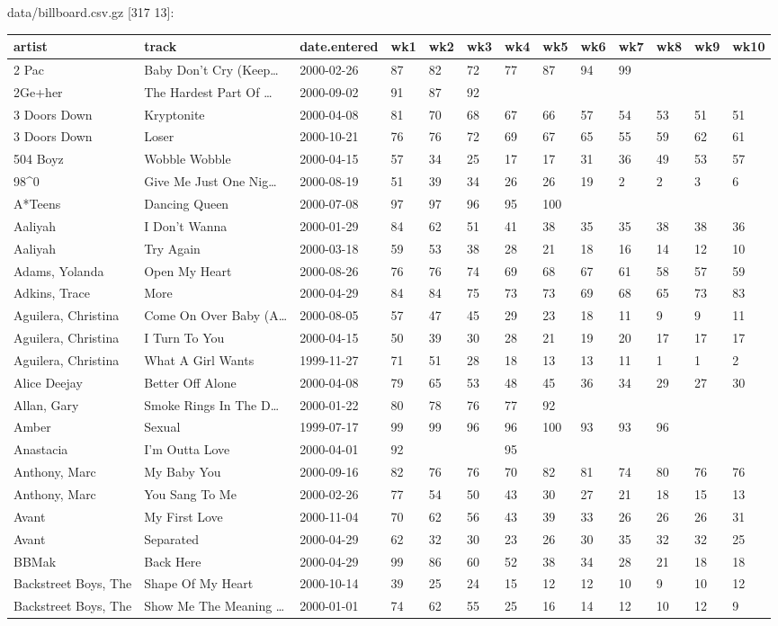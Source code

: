 \documentclass[]{article}
\begin{document}
data/billboard.csv.gz {[}317 13{]}:

\begin{longtable}[]{@{}lllllllllllll@{}}
\toprule
artist & track & date.entered & wk1 & wk2 & wk3 & wk4 & wk5 & wk6 & wk7
& wk8 & wk9 & wk10\tabularnewline
\midrule
\endhead
2 Pac & Baby Don't Cry (Keep\ldots{} & 2000-02-26 & 87 & 82 & 72 & 77 &
87 & 94 & 99 & & &\tabularnewline
2Ge+her & The Hardest Part Of \ldots{} & 2000-09-02 & 91 & 87 & 92 & & &
& & & &\tabularnewline
3 Doors Down & Kryptonite & 2000-04-08 & 81 & 70 & 68 & 67 & 66 & 57 &
54 & 53 & 51 & 51\tabularnewline
3 Doors Down & Loser & 2000-10-21 & 76 & 76 & 72 & 69 & 67 & 65 & 55 &
59 & 62 & 61\tabularnewline
504 Boyz & Wobble Wobble & 2000-04-15 & 57 & 34 & 25 & 17 & 17 & 31 & 36
& 49 & 53 & 57\tabularnewline
98\^{}0 & Give Me Just One Nig\ldots{} & 2000-08-19 & 51 & 39 & 34 & 26
& 26 & 19 & 2 & 2 & 3 & 6\tabularnewline
A*Teens & Dancing Queen & 2000-07-08 & 97 & 97 & 96 & 95 & 100 & & & &
&\tabularnewline
Aaliyah & I Don't Wanna & 2000-01-29 & 84 & 62 & 51 & 41 & 38 & 35 & 35
& 38 & 38 & 36\tabularnewline
Aaliyah & Try Again & 2000-03-18 & 59 & 53 & 38 & 28 & 21 & 18 & 16 & 14
& 12 & 10\tabularnewline
Adams, Yolanda & Open My Heart & 2000-08-26 & 76 & 76 & 74 & 69 & 68 &
67 & 61 & 58 & 57 & 59\tabularnewline
Adkins, Trace & More & 2000-04-29 & 84 & 84 & 75 & 73 & 73 & 69 & 68 &
65 & 73 & 83\tabularnewline
Aguilera, Christina & Come On Over Baby (A\ldots{} & 2000-08-05 & 57 &
47 & 45 & 29 & 23 & 18 & 11 & 9 & 9 & 11\tabularnewline
Aguilera, Christina & I Turn To You & 2000-04-15 & 50 & 39 & 30 & 28 &
21 & 19 & 20 & 17 & 17 & 17\tabularnewline
Aguilera, Christina & What A Girl Wants & 1999-11-27 & 71 & 51 & 28 & 18
& 13 & 13 & 11 & 1 & 1 & 2\tabularnewline
Alice Deejay & Better Off Alone & 2000-04-08 & 79 & 65 & 53 & 48 & 45 &
36 & 34 & 29 & 27 & 30\tabularnewline
Allan, Gary & Smoke Rings In The D\ldots{} & 2000-01-22 & 80 & 78 & 76 &
77 & 92 & & & & &\tabularnewline
Amber & Sexual & 1999-07-17 & 99 & 99 & 96 & 96 & 100 & 93 & 93 & 96 &
&\tabularnewline
Anastacia & I'm Outta Love & 2000-04-01 & 92 & & & 95 & & & & &
&\tabularnewline
Anthony, Marc & My Baby You & 2000-09-16 & 82 & 76 & 76 & 70 & 82 & 81 &
74 & 80 & 76 & 76\tabularnewline
Anthony, Marc & You Sang To Me & 2000-02-26 & 77 & 54 & 50 & 43 & 30 &
27 & 21 & 18 & 15 & 13\tabularnewline
Avant & My First Love & 2000-11-04 & 70 & 62 & 56 & 43 & 39 & 33 & 26 &
26 & 26 & 31\tabularnewline
Avant & Separated & 2000-04-29 & 62 & 32 & 30 & 23 & 26 & 30 & 35 & 32 &
32 & 25\tabularnewline
BBMak & Back Here & 2000-04-29 & 99 & 86 & 60 & 52 & 38 & 34 & 28 & 21 &
18 & 18\tabularnewline
Backstreet Boys, The & Shape Of My Heart & 2000-10-14 & 39 & 25 & 24 &
15 & 12 & 12 & 10 & 9 & 10 & 12\tabularnewline
Backstreet Boys, The & Show Me The Meaning \ldots{} & 2000-01-01 & 74 &
62 & 55 & 25 & 16 & 14 & 12 & 10 & 12 & 9\tabularnewline
\bottomrule
\end{longtable}
\end{document}
